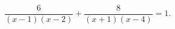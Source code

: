 \begin{ex}[type=equation]
	\begin{condition}
		$\dfrac{6}{(x - 1)(x - 2)} + \dfrac{8}{(x + 1)(x - 4)} = 1.$
	\end{condition}
\end{ex}